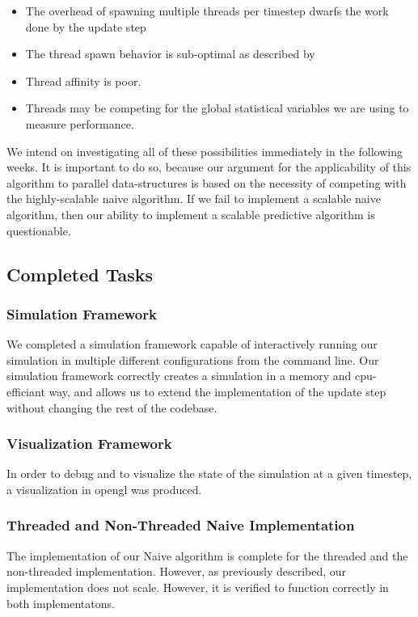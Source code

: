 \documentclass[conference]{IEEEtran}
\begin{document}
\begin{itemize}
	\item The overhead of spawning multiple threads per timestep dwarfs the work done by the update step
	\item The thread spawn behavior is sub-optimal as described by \cite{performance-critical}
	\item Thread affinity is poor.
	\item Threads may be competing for the global statistical variables we are using to measure performance.
\end{itemize}

We intend on investigating all of these possibilities immediately in the following weeks.  It is important to do so, because our argument for the applicability of this algorithm to parallel data-structures
is based on the necessity of competing with the highly-scalable naive algorithm.  If we fail to implement a scalable naive algorithm, then our ability to implement a scalable predictive algorithm is questionable.

\subsection{Completed Tasks}
\subsubsection{Simulation Framework}
We completed a simulation framework capable of interactively running our simulation in multiple different configurations from the command line.  Our simulation framework correctly
creates a simulation in a memory and cpu-efficiant way, and allows us to extend the implementation of the update step without changing the rest of the codebase.
\subsubsection{Visualization Framework}
In order to debug and to visualize the state of the simulation at a given timestep, a visualization in opengl was produced.
\subsubsection{Threaded and Non-Threaded Naive Implementation}
The implementation of our Naive algorithm is complete for the threaded and the non-threaded implementation.  However, as previously described, our implementation does not scale.  However, it is verified to function
correctly in both implementatons.
\end{document}

